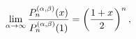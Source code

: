 \[\lim_{\alpha\to\infty}\frac{\mathop{P^{(\alpha,\beta)}_{n}\/}\nolimits\!\left(%
x\right)}{\mathop{P^{(\alpha,\beta)}_{n}\/}\nolimits\!\left(1\right)}=\left(%
\frac{1+x}{2}\right)^{n},\]